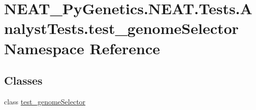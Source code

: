 \hypertarget{namespaceNEAT__PyGenetics_1_1NEAT_1_1Tests_1_1AnalystTests_1_1test__genomeSelector}{}\section{N\+E\+A\+T\+\_\+\+Py\+Genetics.\+N\+E\+A\+T.\+Tests.\+Analyst\+Tests.\+test\+\_\+genome\+Selector Namespace Reference}
\label{namespaceNEAT__PyGenetics_1_1NEAT_1_1Tests_1_1AnalystTests_1_1test__genomeSelector}
\subsection*{Classes}
\begin{DoxyCompactItemize}
\item 
class \hyperlink{classNEAT__PyGenetics_1_1NEAT_1_1Tests_1_1AnalystTests_1_1test__genomeSelector_1_1test__genomeSelector}{test\+\_\+genome\+Selector}
\end{DoxyCompactItemize}
